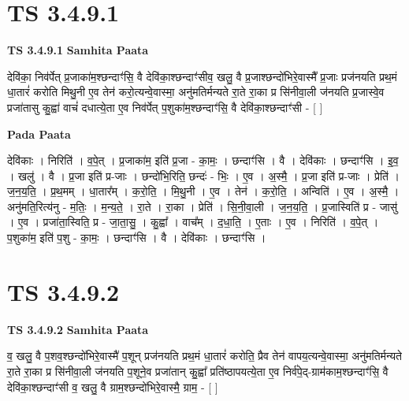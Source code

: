 \documentclass[17pt]{extarticle}
\begin{document}
\section*{ TS 3.4.9.1 }

\textbf{TS 3.4.9.1 } \newline
\textbf{Samhita Paata} \newline

देवि॑का॒ निव॑र्पेत् प्र॒जाका॑म॒श्छन्दाꣳ॑सि॒ वै देवि॑का॒श्छन्दाꣳ॑सीव॒ खलु॒ वै प्र॒जाश्छन्दो॑भिरे॒वास्मै᳚ प्र॒जाः प्रज॑नयति प्रथ॒मं धा॒तारं॑ करोति मिथु॒नी ए॒व तेन॑ करो॒त्यन्वे॒वास्मा॒ अनु॑मतिर्मन्यते रा॒ते रा॒का प्र सि॑नीवा॒ली ज॑नयति प्र॒जास्वे॒व प्रजा॑तासु कु॒ह्वा॑ वाचं॑ दधात्ये॒ता ए॒व निव॑र्पेत् प॒शुका॑म॒श्छन्दाꣳ॑सि॒ वै देवि॑का॒श्छन्दाꣳ॑सी - [  ] \newline

\textbf{Pada Paata} \newline

देवि॑काः । निरिति॑ । व॒पे॒त् । प्र॒जाका॑म॒ इति॑ प्र॒जा - का॒मः॒ । छन्दाꣳ॑सि । वै । देवि॑काः । छन्दाꣳ॑सि । इ॒व॒ । खलु॑ । वै । प्र॒जा इति॑ प्र-जाः । छन्दो॑भि॒रिति॒ छन्दः॑ - भिः॒ । ए॒व । अ॒स्मै॒ । प्र॒जा इति॑ प्र-जाः । प्रेति॑ । ज॒न॒य॒ति॒ । प्र॒थ॒मम् । धा॒तार᳚म् । क॒रो॒ति॒ । मि॒थु॒नी । ए॒व । तेन॑ । क॒रो॒ति॒ । अन्विति॑ । ए॒व । अ॒स्मै॒ । अनु॑मति॒रित्य॑नु - म॒तिः॒ । म॒न्य॒ते॒ । रा॒ते । रा॒का । प्रेति॑ । सि॒नी॒वा॒ली । ज॒न॒य॒ति॒ । प्र॒जास्विति॑ प्र - जासु॑ । ए॒व । प्रजा॑ता॒स्विति॒ प्र - जा॒ता॒सु॒ । कु॒ह्वा᳚ । वाच᳚म् । द॒धा॒ति॒ । ए॒ताः । ए॒व । निरिति॑ । व॒पे॒त् । प॒शुका॑म॒ इति॑ प॒शु - का॒मः॒ । छन्दाꣳ॑सि । वै । देवि॑काः । छन्दाꣳ॑सि ।  \newline




\section*{ TS 3.4.9.2 }

\textbf{TS 3.4.9.2 } \newline
\textbf{Samhita Paata} \newline

व॒ खलु॒ वै प॒शव॒श्छन्दो॑भिरे॒वास्मै॑ प॒शून् प्रज॑नयति प्रथ॒मं धा॒तारं॑ करोति॒ प्रैव तेन॑ वापय॒त्यन्वे॒वास्मा॒ अनु॑मतिर्मन्यते रा॒ते रा॒का प्र सि॑नीवा॒ली ज॑नयति प॒शूने॒व प्रजा॑तान् कु॒ह्वा᳚ प्रति॑ष्ठापयत्ये॒ता ए॒व निर्व॑पे॒द्-ग्राम॑काम॒श्छन्दाꣳ॑सि॒ वै देवि॑का॒श्छन्दाꣳ॑सी व॒ खलु॒ वै ग्राम॒श्छन्दो॑भिरे॒वास्मै॒ ग्राम॒ - [  ] \newline
\end{document}
